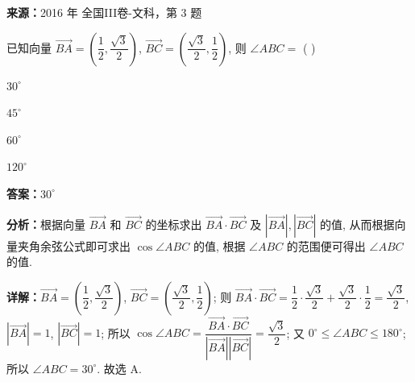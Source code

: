 \begin{question}[points=5]
\textbf{来源：}2016 年 全国III卷-文科，第 3 题\par
已知向量 $\overrightarrow{BA}=(\dfrac{1}{2},\dfrac{\sqrt{3}}{2})$, $\overrightarrow{BC}=(\dfrac{\sqrt{3}}{2},\dfrac{1}{2})$, 则 $\angle ABC=$ ( )
\begin{choices}
  \item $30^{\circ}$
  \item $45^{\circ}$
  \item $60^{\circ}$
  \item $120^{\circ}$
\end{choices}
\begin{solution}
\textbf{答案：}$30^{\circ}$

\textbf{分析：}根据向量 $\overrightarrow{BA}$ 和 $\overrightarrow{BC}$ 的坐标求出 $\overrightarrow{BA}\cdot\overrightarrow{BC}$ 及 $|\overrightarrow{BA}|,|\overrightarrow{BC}|$ 的值, 从而根据向量夹角余弦公式即可求出 $\cos\angle ABC$ 的值, 根据 $\angle ABC$ 的范围便可得出 $\angle ABC$ 的值.

\textbf{详解：}$\overrightarrow{BA}=(\dfrac{1}{2},\dfrac{\sqrt{3}}{2})$, $\overrightarrow{BC}=(\dfrac{\sqrt{3}}{2},\dfrac{1}{2})$; 则 $\overrightarrow{BA}\cdot\overrightarrow{BC}=\dfrac{1}{2}\cdot\dfrac{\sqrt{3}}{2}+\dfrac{\sqrt{3}}{2}\cdot\dfrac{1}{2}=\dfrac{\sqrt{3}}{2}$, $|\overrightarrow{BA}|=1$, $|\overrightarrow{BC}|=1$; 所以 $\cos\angle ABC=\dfrac{\overrightarrow{BA}\cdot\overrightarrow{BC}}{|\overrightarrow{BA}||\overrightarrow{BC}|}=\dfrac{\sqrt{3}}{2}$; 又 $0^{\circ}\le\angle ABC\le180^{\circ}$; 所以 $\angle ABC=30^{\circ}$. 故选 A.
\end{solution}
\end{question}

